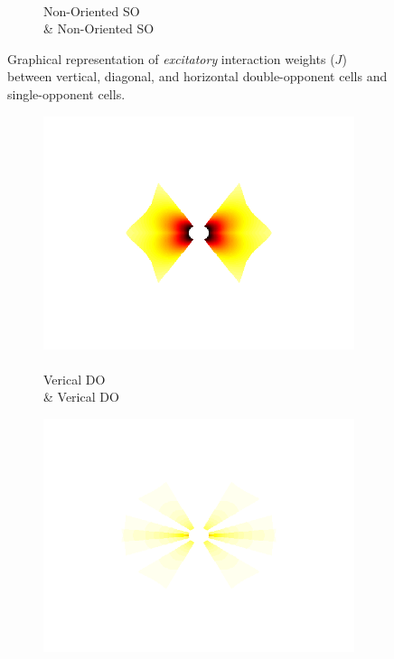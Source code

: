\documentclass[journal,onecolumn]{IEEEtran}
\begin{document}
\begin{figure}[h]
\begin{subfigure}[b]{0.2\textwidth}
            \caption{\\ Non-Oriented SO \\ \& Non-Oriented SO}
    \end{subfigure}%
    \caption{Graphical representation of \textit{excitatory} interaction weights ($J$) between vertical, diagonal, and horizontal double-opponent cells and single-opponent cells.}
\end{figure}

\begin{figure}[h] \label{fig:bowtie-excite-maps}
    \centering
    \begin{subfigure}[b]{0.2\textwidth}
            \centering
            \captionsetup{justification=centering}
            \includegraphics[width=.85\linewidth]{w_1_1}
            \caption{\\ Verical DO \\ \& Verical DO}
    \end{subfigure}%
    \begin{subfigure}[b]{0.2\textwidth}
            \centering
            \captionsetup{justification=centering}
            \includegraphics[width=.85\linewidth]{w_1_2}

\end{subfigure}
\end{figure}
\end{document}
